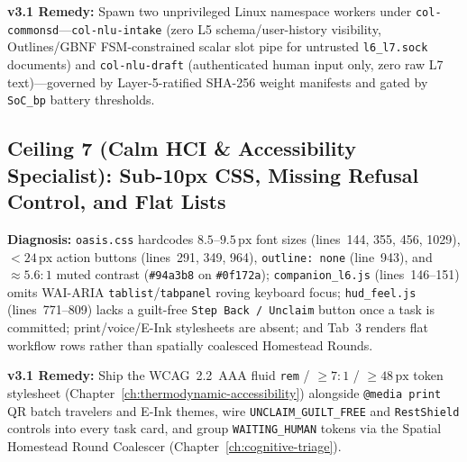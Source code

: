 \textbf{v3.1 Remedy:} Spawn two unprivileged Linux namespace workers under \texttt{col-commonsd}---\texttt{col-nlu-intake} (zero L5 schema/user-history visibility, Outlines/GBNF FSM-constrained scalar slot pipe for untrusted \texttt{l6\_l7.sock} documents) and \texttt{col-nlu-draft} (authenticated human input only, zero raw L7 text)---governed by Layer-5-ratified SHA-256 weight manifests and gated by \texttt{SoC\_bp} battery thresholds.

\subsection{Ceiling 7 (Calm HCI \& Accessibility Specialist): Sub-10px CSS, Missing Refusal Control, and Flat Lists}
\textbf{Diagnosis:} \texttt{oasis.css} hardcodes $8.5\text{--}9.5\,\mathrm{px}$ font sizes (lines~144, 355, 456, 1029), $< 24\,\mathrm{px}$ action buttons (lines~291, 349, 964), \texttt{outline: none} (line~943), and $\approx 5.6:1$ muted contrast (\texttt{\#94a3b8} on \texttt{\#0f172a}); \texttt{companion\_l6.js} (lines~146--151) omits WAI-ARIA \texttt{tablist}/\texttt{tabpanel} roving keyboard focus; \texttt{hud\_feel.js} (lines~771--809) lacks a guilt-free \texttt{Step Back / Unclaim} button once a task is committed; print/voice/E-Ink stylesheets are absent; and Tab~3 renders flat workflow rows rather than spatially coalesced Homestead Rounds.

\textbf{v3.1 Remedy:} Ship the WCAG~2.2~AAA fluid \texttt{rem} / $\ge 7:1$ / $\ge 48\,\mathrm{px}$ token stylesheet (Chapter~\ref{ch:thermodynamic-accessibility}) alongside \texttt{@media print} QR batch travelers and E-Ink themes, wire \texttt{UNCLAIM\_GUILT\_FREE} and \texttt{RestShield} controls into every task card, and group \texttt{WAITING\_HUMAN} tokens via the Spatial Homestead Round Coalescer (Chapter~\ref{ch:cognitive-triage}).

